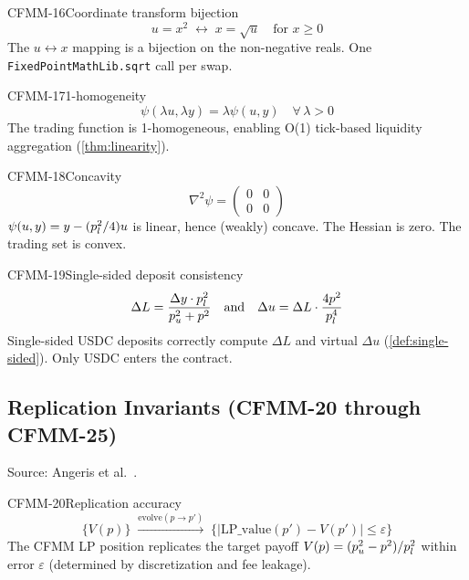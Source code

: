 \begin{invariant}{CFMM-16}{Coordinate transform bijection}
\[
  u = x^2 \;\longleftrightarrow\; x = \sqrt{u} \quad\text{for } x \geq 0
\]
The $u \leftrightarrow x$ mapping is a bijection on the non-negative reals.
One \texttt{FixedPointMathLib.sqrt} call per swap.
\end{invariant}

\begin{invariant}{CFMM-17}{1-homogeneity}
\[
  \psi(\lambda u, \lambda y) = \lambda \psi(u, y) \quad\forall\, \lambda > 0
\]
The trading function is 1-homogeneous, enabling O(1) tick-based liquidity
aggregation (\cref{thm:linearity}).
\end{invariant}

\begin{invariant}{CFMM-18}{Concavity}
\[
  \nabla^2 \psi =
  \begin{pmatrix} 0 & 0 \\ 0 & 0 \end{pmatrix}
\]
$\psi(u,y) = y - (p_l^2/4)u$ is linear, hence (weakly) concave.
The Hessian is zero. The trading set is convex.
\end{invariant}

\begin{invariant}{CFMM-19}{Single-sided deposit consistency}
\[
  \Delta L = \frac{\Delta y \cdot p_l^2}{p_u^2 + p^2}
  \quad\text{and}\quad
  \Delta u = \Delta L \cdot \frac{4p^2}{p_l^4}
\]
Single-sided USDC deposits correctly compute $\Delta L$ and virtual $\Delta u$
(\cref{def:single-sided}). Only USDC enters the contract.
\end{invariant}

\subsection{Replication Invariants (CFMM-20 through CFMM-25)}\label{sec:replication}

Source: Angeris et al.\ \cite{angeris2021replicating,angeris2023geometry}.

\begin{invariant}{CFMM-20}{Replication accuracy}
\[
  \{V(p)\}
  \;\xrightarrow{\text{evolve}(p \to p')}\;
  \{|\text{LP\_value}(p') - V(p')| \leq \varepsilon\}
\]
The CFMM LP position replicates the target payoff $V(p) = (p_u^2 - p^2)/p_l^2$
within error $\varepsilon$ (determined by discretization and fee leakage).
\end{invariant}


